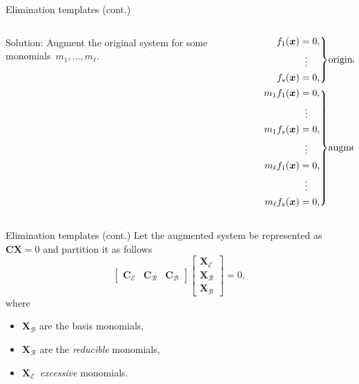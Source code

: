 \documentclass[aspectratio=169]{beamer}
\newcommand{\mat}[1]{\bm{#1}}
\newcommand{\CE}{\ensuremath{\mat{C}_\mathcal{E}}}
\newcommand{\CR}{\ensuremath{\mat{C}_\mathcal{R}}}
\newcommand{\CB}{\ensuremath{\mat{C}_\mathcal{B}}}
\newcommand{\XE}{\ensuremath{\mat{X}_\mathcal{E}}}
\newcommand{\XR}{\ensuremath{\mat{X}_\mathcal{R}}}
\newcommand{\XB}{\ensuremath{\mat{X}_\mathcal{B}}}
\begin{document}
\begin{frame}{Elimination templates (cont.)}
\begin{columns}
    \begin{column}{0.5\textwidth}
\alert{Solution:}
Augment the original system
for some monomials~$m_1,\ldots, m_\ell$.
    \end{column}%
    \begin{column}{0.5\textwidth}
\footnotesize
\begin{equation*}
    \begin{aligned}
    \left.
    \begin{aligned}
    f_1(\mat{x}) & = 0, \\
                 & \hspace{0.575em} \vdots \\
    f_s(\mat{x}) & = 0, \\
    \end{aligned}
    \right\}&\text{original}
    \\
    \left.
    \begin{aligned}
    m_1f_1(\mat{x}) & = 0, \\
                 & \hspace{0.575em} \vdots \\
    m_1f_s(\mat{x}) & = 0, \\
                 & \hspace{0.575em} \vdots \\
    m_\ell f_1(\mat{x}) & = 0, \\
                 & \hspace{0.575em} \vdots \\
    m_\ell f_s(\mat{x}) & = 0,
    \end{aligned}
    \right\}&\text{augmented}
    \end{aligned}
\end{equation*}
    \end{column}
\end{columns}
\end{frame}

\begin{frame}{Elimination templates (cont.)}
Let the augmented system be represented as~$\mat{CX}=0$ and partition it as follows
\begin{equation*}
    \begin{bmatrix}
        \CE &
        \CR &
        \CB
    \end{bmatrix}
    \begin{bmatrix}
        \XE \\
        \XR \\
        \XB
    \end{bmatrix}
    = 0,
\end{equation*}
where
\begin{itemize}
\item $\XB$ are the basis monomials,
\item $\XR$ are the \emph{reducible} monomials,
\item $\XE$~\emph{excessive} monomials.
\end{itemize}
\end{frame}
\end{document}
